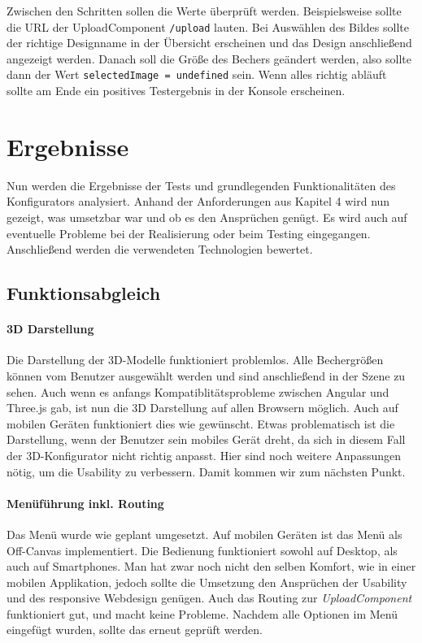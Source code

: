%
Zwischen den Schritten sollen die Werte überprüft werden. Beispielsweise sollte die URL der UploadComponent \texttt{/upload} lauten. Bei Auswählen des Bildes sollte der richtige Designname in der Übersicht erscheinen und das Design anschließend angezeigt werden. Danach soll die Größe des Bechers geändert werden, also sollte dann der Wert \texttt{selectedImage = undefined} sein. Wenn alles richtig abläuft sollte am Ende ein positives Testergebnis in der Konsole erscheinen. 
\section{Ergebnisse}
Nun werden die Ergebnisse der Tests und grundlegenden Funktionalitäten des Konfigurators analysiert. Anhand der Anforderungen aus Kapitel 4 wird nun gezeigt, was umsetzbar war und ob es den Ansprüchen genügt. Es wird auch auf eventuelle Probleme bei der Realisierung oder beim Testing eingegangen. Anschließend werden die verwendeten Technologien bewertet.
\subsection{Funktionsabgleich}
\paragraph{3D Darstellung}
Die Darstellung der 3D-Modelle funktioniert problemlos. Alle Bechergrößen können vom Benutzer ausgewählt werden und sind anschließend in der Szene zu sehen. Auch wenn es anfangs Kompatiblitätsprobleme zwischen Angular und Three.js gab, ist nun die 3D Darstellung auf allen Browsern möglich. Auch auf mobilen Geräten funktioniert dies wie gewünscht. Etwas problematisch ist die Darstellung, wenn der Benutzer sein mobiles Gerät dreht, da sich in diesem Fall der 3D-Konfigurator nicht richtig anpasst. Hier sind noch weitere Anpassungen nötig, um die Usability zu verbessern. Damit kommen wir zum nächsten Punkt.
\paragraph{Menüführung inkl. Routing}
Das Menü wurde wie geplant umgesetzt. Auf mobilen Geräten ist das Menü als Off-Canvas implementiert. Die Bedienung funktioniert sowohl auf Desktop, als auch auf Smartphones. Man hat zwar noch nicht den selben Komfort, wie in einer mobilen Applikation, jedoch sollte die Umsetzung den Ansprüchen der Usability und des responsive Webdesign genügen. Auch das Routing zur \textit{UploadComponent} funktioniert gut, und macht keine Probleme. Nachdem alle Optionen im Menü eingefügt wurden, sollte das erneut geprüft werden.
